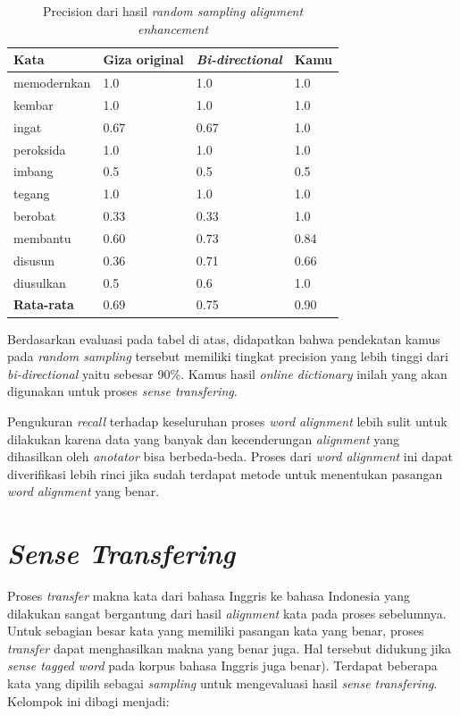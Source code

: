 \begin{table}
	\centering
	\caption{Precision dari hasil \textit{random sampling alignment enhancement}}
	\label{table:enhancement-precision}
	\begin{tabular}{|p{2.5cm}|p{3cm}|p{3cm}|p{3cm}|}
		\hline
		\textbf{Kata} & \textbf{Giza original} & \textbf{\textit{Bi-directional}} & \textbf{Kamu}
		\\ \hline
		memodernkan & 1.0 & 1.0 & 1.0 \\ \hline
		kembar & 1.0 & 1.0 & 1.0 \\ \hline
		ingat & 0.67 & 0.67 & 1.0 \\ \hline
		peroksida & 1.0 & 1.0 & 1.0 \\ \hline
		imbang & 0.5 & 0.5 & 0.5 \\ \hline
		tegang & 1.0  & 1.0 & 1.0 \\ \hline
		berobat & 0.33  & 0.33 & 1.0 \\ \hline
		membantu & 0.60 & 0.73 & 0.84 \\ \hline
		disusun & 0.36  & 0.71 & 0.66 \\ \hline
		diusulkan & 0.5 & 0.6 & 1.0 \\ \hline	
		\hline
		\textbf{Rata-rata} & 0.69 & 0.75 & 0.90 \\ \hline
	\end{tabular}
\end{table}

Berdasarkan evaluasi pada tabel di atas, didapatkan bahwa pendekatan kamus pada \textit{random sampling} tersebut memiliki tingkat precision yang lebih tinggi dari \textit{bi-directional} yaitu sebesar 90\%. Kamus hasil \textit{online dictionary} inilah yang akan digunakan untuk proses \textit{sense transfering}.

Pengukuran \textit{recall} terhadap keseluruhan proses \textit{word alignment} lebih sulit untuk dilakukan karena data yang banyak dan kecenderungan \textit{alignment} yang dihasilkan oleh \textit{anotator} bisa berbeda-beda. Proses dari \textit{word alignment} ini dapat diverifikasi lebih rinci jika sudah terdapat metode untuk menentukan pasangan \textit{word alignment} yang benar.

\section{\textit{Sense Transfering}}

Proses \textit{transfer} makna kata dari bahasa Inggris ke bahasa Indonesia yang dilakukan sangat bergantung dari hasil \textit{alignment} kata pada proses sebelumnya. Untuk sebagian besar kata yang memiliki pasangan kata yang benar, proses \textit{transfer} dapat menghasilkan makna yang benar juga. Hal tersebut didukung jika \textit{sense tagged word} pada korpus bahasa Inggris juga benar). Terdapat beberapa kata yang dipilih sebagai \textit{sampling} untuk mengevaluasi hasil \textit{sense transfering}. Kelompok ini dibagi menjadi:

